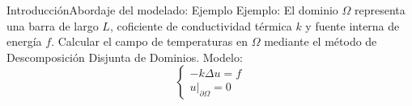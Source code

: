 \begin{frame}{Introducción}{Abordaje del modelado: Ejemplo}
Ejemplo: El dominio $\Omega$ representa una barra de largo $L$, coficiente de conductividad térmica $k$ y fuente interna de energía $f$.
Calcular el campo de temperaturas en $\Omega$ mediante el método
de Descomposición Disjunta de Dominios. Modelo:
\begin{equation*}
\left\{\begin{matrix}
-k \Delta u=f \\
\left.u\right|_{\partial\Omega}=0
\end{matrix}\right.
\label{ecuacion-calor}
\end{equation*}

\centering

\end{frame}


